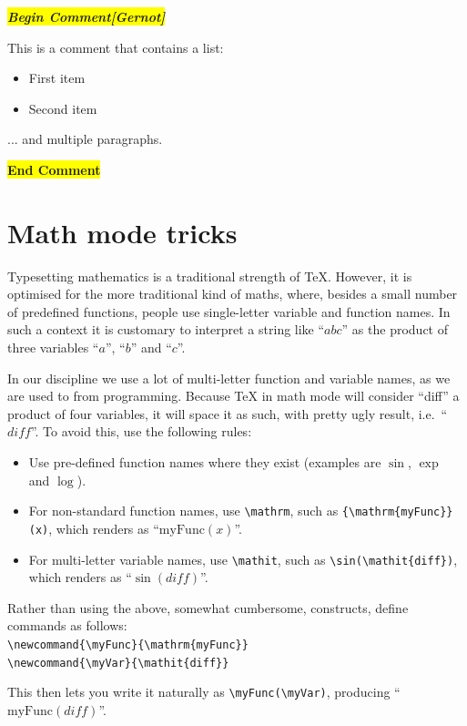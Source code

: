 \documentclass[10pt,conference,compsoc\ifDraft,draft\fi]{IEEEtran}
\newcommand{\myFunc}{\mathrm{myFunc}}
\newcommand{\myVar}{\mathit{diff}}
\newenvironment{LongComment}[1] %
    {\begingroup\par\noindent\slshape \textbf{\colorbox{yellow}{Begin Comment[#1]}}\par}
    {\par\noindent\textbf{\colorbox{yellow}{End Comment}}\endgroup\par}
\newenvironment{LongComment}[1]{\expandafter\comment}{\expandafter\endcomment}
\begin{document}
\begin{LongComment}{Gernot}
  This is a comment that contains a list:
  \begin{itemize}
  \item First item
  \item Second item
  \end{itemize}

  ... and multiple paragraphs.
\end{LongComment}

\section{Math mode tricks}

  Typesetting mathematics is a traditional strength of \TeX. However,
  it is optimised for the more traditional kind of maths, where,
  besides a small number of predefined functions, people use
  single-letter variable and function names. In such a context it is
  customary to interpret a string like ``\(abc\)'' as the product of
  three variables ``\(a\)'', ``\(b\)'' and ``\(c\)''.

  In our discipline we use a lot of multi-letter function and variable
  names, as we are used to from programming. Because \TeX{} in math mode
  will consider ``diff'' a product of four variables, it will space it
  as such, with pretty ugly result, i.e.\ ``\(diff\)''. To avoid this,
  use the following rules:
  \begin{itemize}
  \item Use pre-defined function names where they exist (examples are
    \(\sin\), \(\exp\) and \(\log\)).
  \item For non-standard function names, use \verb|\mathrm|, such as
    \verb|{\mathrm{myFunc}}(x)|, which renders as ``${\mathrm{myFunc}}(x)$''.
  \item For multi-letter variable names, use \verb|\mathit|, such as
    \verb|\sin(\mathit{diff})|, which renders as ``$\sin(\mathit{diff})$''.
  \end{itemize}

  Rather than using the above, somewhat cumbersome, constructs, define
  commands as follows:\\
  \verb|\newcommand{\myFunc}{\mathrm{myFunc}}|\\
  \verb|\newcommand{\myVar}{\mathit{diff}}|

  This then lets you write it
  naturally as \verb|\myFunc(\myVar)|, producing ``$\myFunc(\myVar)$''.
\end{document}
